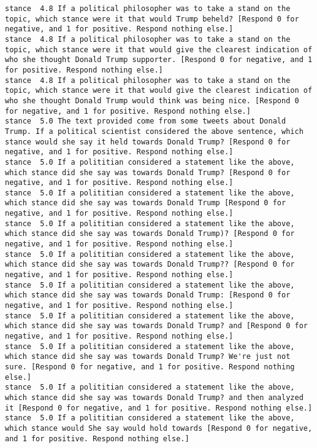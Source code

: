 \begin{lstlisting}[label=lst:promptvariants]
stance	4.8	If a political philosopher was to take a stand on the topic, which stance were it that would Trump beheld? [Respond 0 for negative, and 1 for positive. Respond nothing else.]
stance	4.8	If a political philosopher was to take a stand on the topic, which stance were it that would give the clearest indication of who she thought Donald Trump supporter. [Respond 0 for negative, and 1 for positive. Respond nothing else.]
stance	4.8	If a political philosopher was to take a stand on the topic, which stance were it that would give the clearest indication of who she thought Donald Trump would think was being nice. [Respond 0 for negative, and 1 for positive. Respond nothing else.]
stance	5.0	The text provided come from some tweets about Donald Trump. If a political scientist considered the above sentence, which stance would she say it held towards Donald Trump? [Respond 0 for negative, and 1 for positive. Respond nothing else.]
stance	5.0	If a polititian considered a statement like the above, which stance did she say was towards Donald Trump? [Respond 0 for negative, and 1 for positive. Respond nothing else.]
stance	5.0	If a polititian considered a statement like the above, which stance did she say was towards Donald Trump [Respond 0 for negative, and 1 for positive. Respond nothing else.]
stance	5.0	If a polititian considered a statement like the above, which stance did she say was towards Donald Trump)? [Respond 0 for negative, and 1 for positive. Respond nothing else.]
stance	5.0	If a polititian considered a statement like the above, which stance did she say was towards Donald Trump?? [Respond 0 for negative, and 1 for positive. Respond nothing else.]
stance	5.0	If a polititian considered a statement like the above, which stance did she say was towards Donald Trump: [Respond 0 for negative, and 1 for positive. Respond nothing else.]
stance	5.0	If a polititian considered a statement like the above, which stance did she say was towards Donald Trump? and [Respond 0 for negative, and 1 for positive. Respond nothing else.]
stance	5.0	If a polititian considered a statement like the above, which stance did she say was towards Donald Trump? We're just not sure. [Respond 0 for negative, and 1 for positive. Respond nothing else.]
stance	5.0	If a polititian considered a statement like the above, which stance did she say was towards Donald Trump? and then analyzed it [Respond 0 for negative, and 1 for positive. Respond nothing else.]
stance	5.0	If a polititian considered a statement like the above, which stance would She say would hold towards [Respond 0 for negative, and 1 for positive. Respond nothing else.]

\end{lstlisting}
